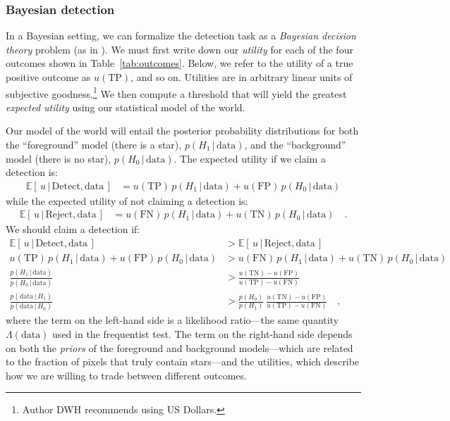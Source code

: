 \documentclass[11pt,letterpaper,linenumbers]{aastex7}
\newcommand{\expect}[1]{\left\langle #1 \right\rangle}
\newcommand{\truepos}{\ensuremath{\mathrm{TP}}}
\newcommand{\falsepos}{\ensuremath{\mathrm{FP}}}
\newcommand{\trueneg}{\ensuremath{\mathrm{TN}}}
\newcommand{\falseneg}{\ensuremath{\mathrm{FN}}}
\newcommand{\squareparens}[1]{\left[ \, #1 \, \right]}
\renewcommand{\expect}[1]{\mathbb{E}\squareparens{#1}}
\newcommand{\fg}{\ensuremath{H_1}}
\newcommand{\bg}{\ensuremath{H_0}}
\newcommand{\data}{\ensuremath{\textrm{data}}}
\newcommand{\given}{\,\vert\,}
\begin{document}

\subsubsection{Bayesian detection}
In a Bayesian setting, we can formalize the detection task as a
\emph{Bayesian decision theory} problem (as in
\citealt{astrometrydotnet}).  We must first write down our \emph{utility}
for each of the four outcomes shown in Table~\ref{tab:outcomes}.
Below, we refer to the utility of a true positive outcome as
$u(\truepos)$, and so on.  Utilities are in arbitrary linear units of
subjective goodness.\footnote{Author DWH recommends using US Dollars.}
We then compute a threshold that will yield the greatest
\emph{expected utility} using our statistical model of the world.


Our model of the world will entail the posterior probability
distributions for both the ``foreground'' model (there is a star),
$p(\fg \given \data)$, and the ``background'' model (there is no star),
$p(\bg \given \data)$.  The expected utility if we claim a detection
is:
\begin{align}
\expect{u \given \mathrm{Detect}, \data}
&= u(\truepos) \, p(\fg \given \data) + u(\falsepos) \, p(\bg \given \data)
\end{align}
while the expected utility of not claiming a detection is:
\begin{align}
\expect{u \given \mathrm{Reject}, \data}
&= u(\falseneg) \, p(\fg \given \data) + u(\trueneg) \, p(\bg \given \data) \quad .
\end{align}
We should claim a detection if:
\begin{align}
\expect{u \given \mathrm{Detect}, \data} 
&>
\expect{u \given \mathrm{Reject}, \data} \\
%
u(\truepos) \, p(\fg \given \data) + u(\falsepos) \, p(\bg \given \data)
&>
u(\falseneg) \, p(\fg \given \data) + u(\trueneg) \, p(\bg \given \data) \\
%
%
\frac{p(\fg \given \data)}{p(\bg \given \data)}
&>
\frac{u(\trueneg) - u(\falsepos)}{u(\truepos) - u(\falseneg)} \\
%
\frac{p(\data \given \fg)}{p(\data \given \bg)}
 &> \frac{p(\bg)}{p(\fg)} \ \frac{u(\trueneg) - u(\falsepos)}{u(\truepos) - u(\falseneg)} \quad ,
\label{eq:kthresh}
\end{align}
where the term on the left-hand side is a likelihood ratio---the same
quantity $\Lambda(\data)$ used in the frequentist test.  The term on the right-hand
side depends on both the \emph{priors} of the foreground and
background models---which are related to the fraction of pixels that
truly contain stars---and the utilities, which describe how we are
willing to trade between different outcomes.
\end{document}
